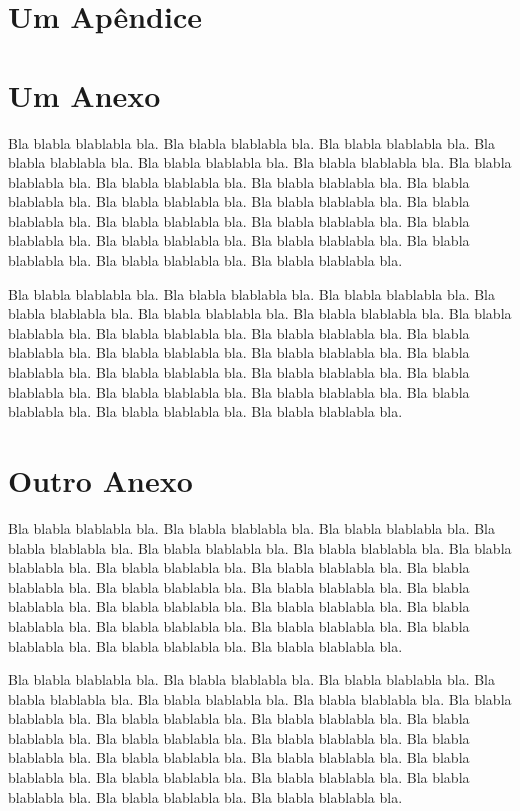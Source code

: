 \documentclass[diss,capa]{texufpel}
\begin{document}
\apendices
\chapter{Um Apêndice}

\anexos
\chapter{Um Anexo}

Bla blabla blablabla bla.  Bla blabla blablabla bla.  Bla blabla
blablabla bla.  Bla blabla blablabla bla.  Bla blabla blablabla bla.
Bla blabla blablabla bla.  Bla blabla blablabla bla.  Bla blabla
blablabla bla.  Bla blabla blablabla bla.  Bla blabla blablabla bla.
Bla blabla blablabla bla.  Bla blabla blablabla bla.  Bla blabla
blablabla bla.  Bla blabla blablabla bla.  Bla blabla blablabla bla.
Bla blabla blablabla bla.  Bla blabla blablabla bla.  Bla blabla
blablabla bla.  Bla blabla blablabla bla.  Bla blabla blablabla bla.
Bla blabla blablabla bla.

Bla blabla blablabla bla.  Bla blabla blablabla bla.  Bla blabla
blablabla bla.  Bla blabla blablabla bla.  Bla blabla blablabla bla.
Bla blabla blablabla bla.  Bla blabla blablabla bla.  Bla blabla
blablabla bla.  Bla blabla blablabla bla.  Bla blabla blablabla bla.
Bla blabla blablabla bla.  Bla blabla blablabla bla.  Bla blabla
blablabla bla.  Bla blabla blablabla bla.  Bla blabla blablabla bla.
Bla blabla blablabla bla.  Bla blabla blablabla bla.  Bla blabla
blablabla bla.  Bla blabla blablabla bla.  Bla blabla blablabla bla.
Bla blabla blablabla bla.

\chapter{Outro Anexo}

Bla blabla blablabla bla.  Bla blabla blablabla bla.  Bla blabla
blablabla bla.  Bla blabla blablabla bla.  Bla blabla blablabla bla.
Bla blabla blablabla bla.  Bla blabla blablabla bla.  Bla blabla
blablabla bla.  Bla blabla blablabla bla.  Bla blabla blablabla bla.
Bla blabla blablabla bla.  Bla blabla blablabla bla.  Bla blabla
blablabla bla.  Bla blabla blablabla bla.  Bla blabla blablabla bla.
Bla blabla blablabla bla.  Bla blabla blablabla bla.  Bla blabla
blablabla bla.  Bla blabla blablabla bla.  Bla blabla blablabla bla.
Bla blabla blablabla bla.

Bla blabla blablabla bla.  Bla blabla blablabla bla.  Bla blabla
blablabla bla.  Bla blabla blablabla bla.  Bla blabla blablabla bla.
Bla blabla blablabla bla.  Bla blabla blablabla bla.  Bla blabla
blablabla bla.  Bla blabla blablabla bla.  Bla blabla blablabla bla.
Bla blabla blablabla bla.  Bla blabla blablabla bla.  Bla blabla
blablabla bla.  Bla blabla blablabla bla.  Bla blabla blablabla bla.
Bla blabla blablabla bla.  Bla blabla blablabla bla.  Bla blabla
blablabla bla.  Bla blabla blablabla bla.  Bla blabla blablabla bla.
Bla blabla blablabla bla.

\end{document}
